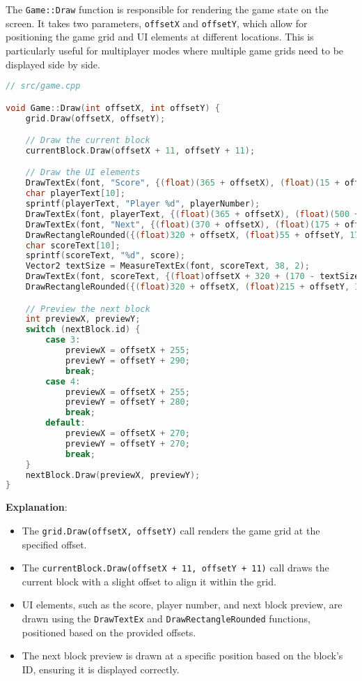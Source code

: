 \documentclass{article}
\begin{document}
The \texttt{Game::Draw} function is responsible for rendering the game state on the screen. It takes two parameters, \texttt{offsetX} and \texttt{offsetY}, which allow for positioning the game grid and UI elements at different locations. This is particularly useful for multiplayer modes where multiple game grids need to be displayed side by side.

\begin{lstlisting}[language=C++]
// src/game.cpp

void Game::Draw(int offsetX, int offsetY) {
    grid.Draw(offsetX, offsetY);

    // Draw the current block
    currentBlock.Draw(offsetX + 11, offsetY + 11);

    // Draw the UI elements
    DrawTextEx(font, "Score", {(float)(365 + offsetX), (float)(15 + offsetY)}, 38, 2, WHITE);
    char playerText[10];
    sprintf(playerText, "Player %d", playerNumber);
    DrawTextEx(font, playerText, {(float)(365 + offsetX), (float)(500 + offsetY)}, 38, 2, WHITE);
    DrawTextEx(font, "Next", {(float)(370 + offsetX), (float)(175 + offsetY)}, 38, 2, WHITE);
    DrawRectangleRounded({(float)320 + offsetX, (float)55 + offsetY, 170, 60}, 0.3, 6, darkGrey);
    char scoreText[10];
    sprintf(scoreText, "%d", score);
    Vector2 textSize = MeasureTextEx(font, scoreText, 38, 2);
    DrawTextEx(font, scoreText, {(float)offsetX + 320 + (170 - textSize.x) / 2, (float)offsetY + 65}, 38, 2, WHITE);
    DrawRectangleRounded({(float)320 + offsetX, (float)215 + offsetY, 170, 180}, 0.3, 6, darkGrey);

    // Preview the next block
    int previewX, previewY;
    switch (nextBlock.id) {
        case 3:
            previewX = offsetX + 255;
            previewY = offsetY + 290;
            break;
        case 4:
            previewX = offsetX + 255;
            previewY = offsetY + 280;
            break;
        default:
            previewX = offsetX + 270;
            previewY = offsetY + 270;
            break;
    }
    nextBlock.Draw(previewX, previewY);
}
\end{lstlisting}

\textbf{Explanation}:

\begin{itemize}
    \item The \texttt{grid.Draw(offsetX, offsetY)} call renders the game grid at the specified offset.
    \item The \texttt{currentBlock.Draw(offsetX + 11, offsetY + 11)} call draws the current block with a slight offset to align it within the grid.
    \item UI elements, such as the score, player number, and next block preview, are drawn using the \texttt{DrawTextEx} and \texttt{DrawRectangleRounded} functions, positioned based on the provided offsets.
    \item The next block preview is drawn at a specific position based on the block's ID, ensuring it is displayed correctly.
\end{itemize}
\end{document}
